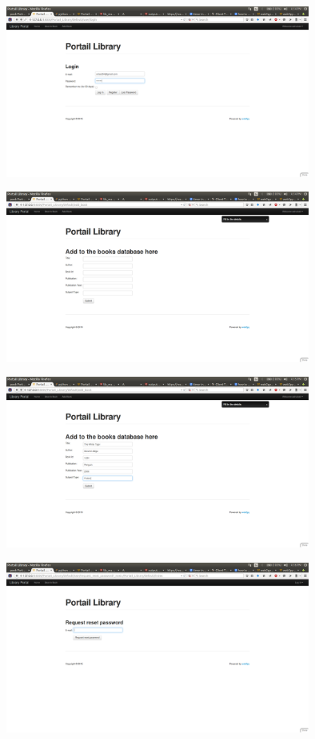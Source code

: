 \documentclass{article}
\begin{document}
\begin{figure}[ht!]
\centering
\includegraphics[width=100mm]{5.png}
\caption{}
\end{figure}
\begin{figure}[ht!]
\centering
\includegraphics[width=100mm]{6.png}
\caption{}
\end{figure}
\begin{figure}[ht!]
\centering
\includegraphics[width=100mm]{7.png}
\caption{}
\end{figure}
\begin{figure}[ht!]
\centering
\includegraphics[width=100mm]{8.png}
\caption{}
\end{figure}
\end{document}
